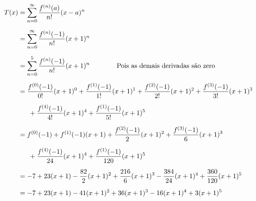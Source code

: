 \documentclass[a4paper,12pt,fleqn]{article}
\begin{document}
\begin{answer}
\begin{align*}
    T(x)
    & = \sum_{n=0}^\infty \frac{f^{(n)}(a)}{n!} (x-a)^n \\[2mm]
    & = \sum_{n=0}^\infty \frac{f^{(n)}(-1)}{n!} (x+1)^n \\[2mm]
    & = \sum_{n=0}^5 \frac{f^{(n)}(-1)}{n!} (x+1)^n
    \qquad\qquad \text{Pois as demais derivadas são zero} \\[2mm]
    & = \frac{f^{(0)}(-1)}{0!} (x+1)^0
      + \frac{f^{(1)}(-1)}{1!} (x+1)^1
      + \frac{f^{(2)}(-1)}{2!} (x+1)^2
      + \frac{f^{(3)}(-1)}{3!} (x+1)^3 \\[2mm]
    & \hphantom{==}
      + \frac{f^{(4)}(-1)}{4!} (x+1)^4
      + \frac{f^{(1)}(-1)}{5!} (x+1)^5
      \\[2mm]
    & = f^{(0)}(-1)
      + f^{(1)}(-1) (x+1)
      + \frac{f^{(2)}(-1)}{2} (x+1)^2
      + \frac{f^{(3)}(-1)}{6} (x+1)^3 \\[2mm]
   &  \hphantom{==}
      + \frac{f^{(4)}(-1)}{24} (x+1)^4
      + \frac{f^{(1)}(-1)}{120} (x+1)^5
      \\[2mm]
    & = -7
      + 23(x+1)
      - \frac{82}{2} (x+1)^2
      + \frac{216}{6} (x+1)^3
      - \frac{384}{24} (x+1)^4
      + \frac{360}{120} (x+1)^5
      \\[2mm]
    & = -7
      + 23(x+1)
      - 41(x+1)^2
      + 36 (x+1)^3
      - 16 (x+1)^4
      + 3(x+1)^5
  \end{align*}
\end{answer}

\end{document}
